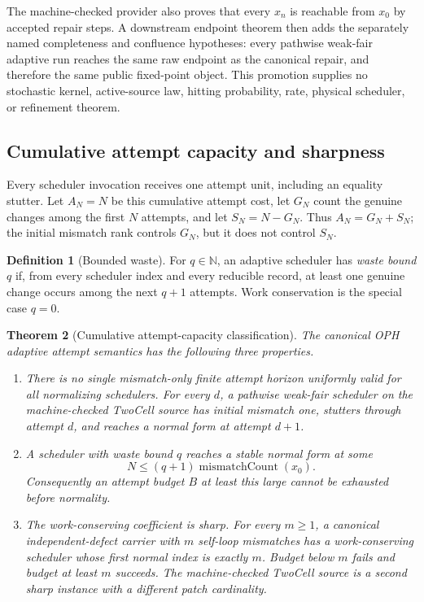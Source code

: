\documentclass[11pt]{article}
\newtheorem{theorem}{Theorem}[section]
\theoremstyle{definition}
\newtheorem{definition}[theorem]{Definition}
\theoremstyle{remark}
\numberwithin{equation}{section}
\begin{document}
The machine-checked provider also proves that every \(x_n\) is reachable from
\(x_0\) by accepted repair steps.  A downstream endpoint theorem then adds the
separately named completeness and confluence hypotheses: every pathwise
weak-fair adaptive run reaches the same raw endpoint as the canonical repair,
and therefore the same public fixed-point object.  This promotion supplies no
stochastic kernel, active-source law, hitting probability, rate, physical
scheduler, or refinement theorem.

\subsection{Cumulative attempt capacity and sharpness}

Every scheduler invocation receives one attempt unit, including an
equality stutter.  Let \(A_N=N\) be this cumulative attempt cost, let \(G_N\)
count the genuine changes among the first \(N\) attempts, and let
\(S_N=N-G_N\).  Thus \(A_N=G_N+S_N\); the initial mismatch rank controls
\(G_N\), but it does not control \(S_N\).

\begin{definition}[Bounded waste]
For \(q\in\mathbb N\), an adaptive scheduler has \emph{waste bound} \(q\) if,
from every scheduler index and every reducible record, at least one genuine
change occurs among the next \(q+1\) attempts.  Work conservation is the
special case \(q=0\).
\end{definition}

\begin{theorem}[Cumulative attempt-capacity classification]
\label{thm:oph-cumulative-attempt-capacity}
The canonical OPH adaptive attempt semantics has the following three
properties.
\begin{enumerate}[label=(\roman*)]
\item There is no single mismatch-only finite attempt horizon uniformly valid
for all normalizing schedulers.  For every \(d\), a pathwise weak-fair scheduler on the machine-checked
TwoCell source has initial mismatch one, stutters through attempt \(d\), and
reaches a normal form at attempt \(d+1\).
\item A scheduler with waste bound \(q\) reaches a stable normal form at some
\[
N\le(q+1)\operatorname{mismatchCount}(x_0).
\]
Consequently an attempt budget \(B\) at least this large cannot be exhausted
before normality.
\item The work-conserving coefficient is sharp.  For every \(m\ge1\), a
canonical independent-defect carrier with \(m\) self-loop mismatches has a
work-conserving scheduler whose first normal index is exactly \(m\).  Budget
below \(m\) fails and budget at least \(m\) succeeds.  The machine-checked TwoCell
source is a second sharp instance with a different patch cardinality.
\end{enumerate}
\end{theorem}
\end{document}
